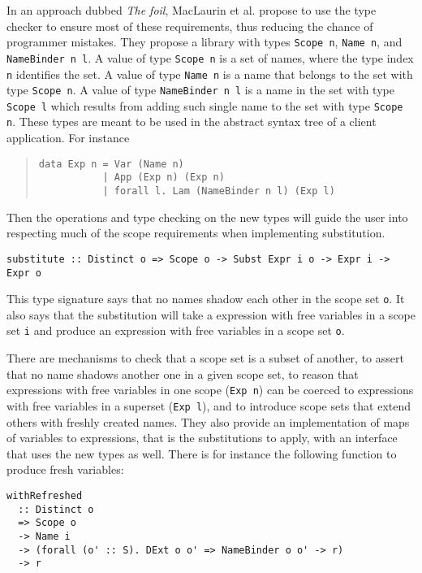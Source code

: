 \documentclass[acmtog, anonymous]{acmart}
\newcommand{\tc}[1]{{\small\texttt{#1}}}
\begin{document}
In an approach dubbed \textit{The foil}, MacLaurin et al. propose to use the type
checker to ensure most of these
requirements, thus reducing the chance of programmer mistakes. They
propose a library with types \tc{Scope n}, \tc{Name n}, and
\tc{Name\-Binder n l}. A value of type \tc{Scope n} is a set of names, where
the type index \tc{n} identifies the set. A value of type \tc{Name n} is a name that
belongs to the set with type \tc{Scope n}. A value of type \tc{NameBinder n l} is
a name in the set with type \tc{Scope l} which results from adding such single
name to the set with type \tc{Scope n}. These types are meant to be used in
the abstract syntax tree of a client application. For instance

\begin{quotation}
\begin{verbatim}
data Exp n = Var (Name n)
           | App (Exp n) (Exp n)
           | forall l. Lam (NameBinder n l) (Exp l)
\end{verbatim}
\end{quotation}

Then the operations and type checking on the new types will guide the user into
respecting much of the scope requirements when implementing substitution.

\begin{verbatim}
substitute :: Distinct o => Scope o -> Subst Expr i o -> Expr i -> Expr o
\end{verbatim}

This type signature says that no names shadow each other in the scope set \tc{o}.
It also says that the substitution will take a expression with free variables in
a scope set \tc{i} and produce an expression with free variables in a scope set
\tc{o}.

There
are mechanisms to check that a scope set is a subset of another, to assert that no
name shadows another one in a given scope set, to reason that expressions
with free variables in one scope (\tc{Exp n}) can be coerced to expressions with
free variables in a superset (\tc{Exp l}), and to introduce scope sets that extend
others with freshly created names. They also provide an implementation of maps of
variables to expressions, that is the substitutions to apply, with an interface
that uses the new types as well. There is for instance the following function to
produce fresh variables:

\begin{verbatim}
withRefreshed
  :: Distinct o
  => Scope o
  -> Name i
  -> (forall (o' :: S). DExt o o' => NameBinder o o' -> r)
  -> r
\end{verbatim}
\end{document}
